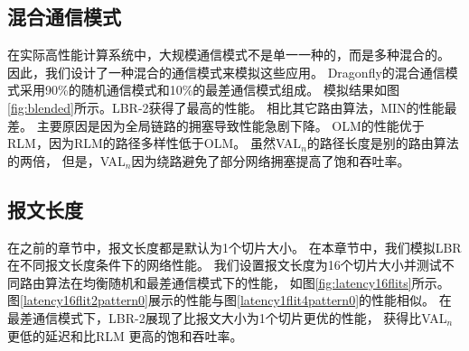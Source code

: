 \subsection{混合通信模式}

在实际高性能计算系统中，大规模通信模式不是单一一种的，而是多种混合的。
因此，我们设计了一种混合的通信模式来模拟这些应用。
Dragonfly的混合通信模式采用90\%的随机通信模式和10\%的最差通信模式组成。
模拟结果如图\ref{fig:blended}所示。LBR-2获得了最高的性能。
相比其它路由算法，MIN的性能最差。
主要原因是因为全局链路的拥塞导致性能急剧下降。
OLM的性能优于RLM，因为RLM的路径多样性低于OLM。
虽然VAL$_n$的路径长度是别的路由算法的两倍，
但是，VAL$_n$因为绕路避免了部分网络拥塞提高了饱和吞吐率。

\begin{figure*}[htbp]
  \centering
  \begin{minipage}[t]{\textwidth}
    \centering
    \caption{混合通信模式}
    \label{fig:blended}
  \end{minipage}
\end{figure*}

\subsection{报文长度}

在之前的章节中，报文长度都是默认为1个切片大小。
在本章节中，我们模拟LBR在不同报文长度条件下的网络性能。
我们设置报文长度为16个切片大小并测试不同路由算法在均衡随机和最差通信模式下的性能，
如图\ref{fig:latency16flits}所示。
图\ref{latency16flit2pattern0}展示的性能与图\ref{latency1flit4pattern0}的性能相似。
在最差通信模式下，LBR-2展现了比报文大小为1个切片更优的性能，
获得比VAL$_n$更低的延迟和比RLM 更高的饱和吞吐率。

\begin{figure*}[htbp]

  \centering
  \begin{minipage}[t]{\textwidth}
    \centering
    \caption{报文长度为16个切片的延迟}
    \label{fig:latency16flits}
  \end{minipage}
\end{figure*}

